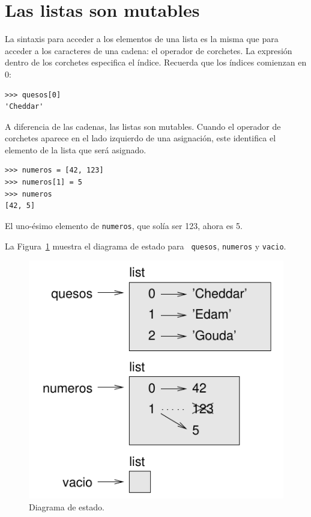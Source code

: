 \documentclass[10pt]{book}
\begin{document}
\section{Las listas son mutables}
\label{mutable}

La sintaxis para acceder a los elementos de una lista es la misma que para
acceder a los caracteres de una cadena: el operador de corchetes.  La
expresión dentro de los corchetes especifica el índice.  Recuerda que los
índices comienzan en 0:

\begin{verbatim}
>>> quesos[0]
'Cheddar'
\end{verbatim}
%
A diferencia de las cadenas, las listas son mutables.  Cuando el operador de corchetes aparece
en el lado izquierdo de una asignación, este identifica el elemento de la
lista que será asignado.

\begin{verbatim}
>>> numeros = [42, 123]
>>> numeros[1] = 5
>>> numeros
[42, 5]
\end{verbatim}
%
El uno-ésimo elemento de {\tt numeros}, que
solía ser 123, ahora es 5.

La Figura~\ref{fig.liststate} muestra
el diagrama de estado para {\tt
quesos}, {\tt numeros} y {\tt vacio}.

\begin{figure}
\centerline
{\includegraphics[scale=0.8]{figs/liststate.pdf}}
\caption{Diagrama de estado.}
\label{fig.liststate}
\end{figure}
\end{document}
